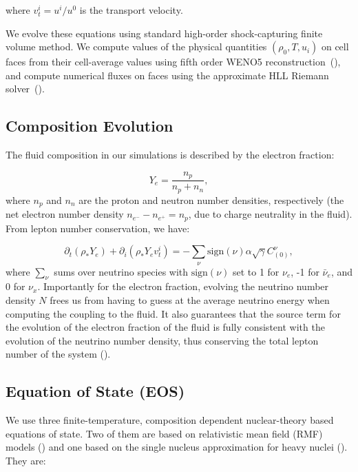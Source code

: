 where $v_t^i = u^i/u^0$ is the transport velocity.

We evolve these equations using standard high-order shock-capturing finite volume method. We compute values of the physical quantities $(\rho_0,T,u_i)$ on cell faces from their cell-average values using fifth order WENO5 reconstruction~(\citet*{borges}), and compute numerical fluxes on faces using the approximate HLL Riemann solver~(\citet*{hll}).

\subsection{Composition Evolution}

The fluid composition in our simulations is described by the electron fraction:

\begin{equation}
  Y_e = \frac{n_p}{n_p + n_n},
\end{equation}
%
where $n_p$ and $n_n$ are the proton and neutron number densities, respectively (the net electron number density $n_{e^{-}} - n_{e^{+}} = n_p$, due to charge neutrality in the fluid). From lepton number conservation, we have:

\begin{equation}
  \partial_t \left(\rho_* Y_e \right) + \partial_i\left(\rho_*Y_e v_t^i\right)= -\sum_{\nu}\textrm{sign}(\nu)\alpha \sqrt{\gamma} C^{\nu}_{(0)},
\end{equation}
%
where $\sum_{\nu}$ sums over neutrino species with $\textrm{sign}(\nu)$ set to 1 for $\nu_e$, -1 for $\bar \nu_e$, and 0 for $\nu_x$. Importantly for the electron fraction, evolving the neutrino number density $N$ frees us from having to guess at the average neutrino energy when computing the coupling to the fluid. It also guarantees that the source term for the evolution of the electron fraction of the fluid is fully consistent with the evolution of the neutrino number density, thus conserving the total lepton number of the system (\citet*{foucart2016impact}). 

\subsection{Equation of State (EOS)}

We use three finite-temperature, composition dependent nuclear-theory based equations of state. Two of them are based on relativistic mean field (RMF) models  (\citet*{walecka1974theory}) and one based on the single nucleus approximation for heavy nuclei (\citet*{lattimer1991generalized}). They are:

